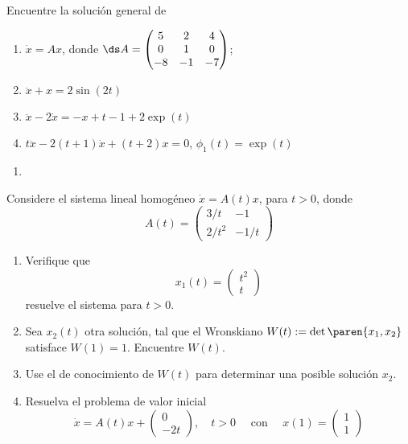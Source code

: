 \documentclass{homework}
\begin{document}
\begin{prob}
    Encuentre la solución general de
    \begin{enumerate}[label=(\alph*)]
        \item \(\dot{x}=Ax\), donde \(\ds A=\begin{pmatrix}
            5&2&4\\0&1&0\\-8&-1&-7
        \end{pmatrix}\);
        \item \(\ddot{x}+x=2\sin(2t)\)
        \item \(\ddot{x}-2\dot{x}=-x+t-1+2\exp(t)\)
        \item \(t\ddot{x}-2(t+1)\dot{x}+(t+2)x=0\), \(\phi_1(t)=\exp(t)\)
    \end{enumerate}
\end{prob}

\begin{sol}
    \begin{enumerate}[label=(\alph*)]
        \item 
    \end{enumerate}
\end{sol}

\begin{prob}
    Considere el sistema lineal homogéneo \(\dot{x}=A(t)x\), para \(t>0\), donde
    \[A(t)=\begin{pmatrix}
        3/t&-1\\2/t^2&-1/t
    \end{pmatrix}\]
    \begin{enumerate}[label=(\alph*)]
        \item Verifique que
        \[x_1(t)=\begin{pmatrix}
            t^2\\t
        \end{pmatrix}\]
        resuelve el sistema para \(t>0\).
        \item Sea \(x_2(t)\) otra solución, tal que el Wronskiano \(W(t):=\det\paren{x_1,x_2}\) satisface \(W(1)=1\). Encuentre \(W(t)\).
        \item Use el de conocimiento de \(W(t)\) para determinar una posible solución \(x_2\).
        \item Resuelva el problema de valor inicial
        \[\dot{x}=A(t)x+\begin{pmatrix}
            0\\-2t
        \end{pmatrix},\quad t>0\quad\text{ con }\quad x(1)=\begin{pmatrix}
            1\\1
        \end{pmatrix}\]
    \end{enumerate}
\end{prob}
\end{document}
